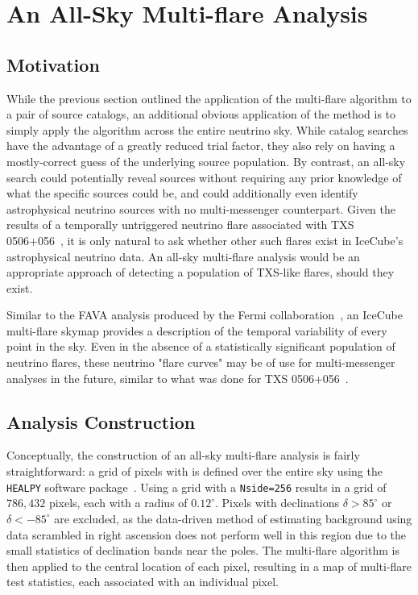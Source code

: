 \chapter{An All-Sky Multi-flare Analysis}\label{chapter:multiflareskymap}
\section{Motivation}
While the previous section outlined the application of the multi-flare algorithm to a pair of source catalogs, an additional obvious application of the method is to simply apply the algorithm across the entire neutrino sky. While catalog searches have the advantage of a greatly reduced trial factor, they also rely on having a mostly-correct guess of the underlying source population. By contrast, an all-sky search could potentially reveal sources without requiring any prior knowledge of what the specific sources could be, and could additionally even identify astrophysical neutrino sources with no multi-messenger counterpart. Given the results of a temporally untriggered neutrino flare associated with TXS 0506+056~\cite{TXS_Archival}, it is only natural to ask whether other such flares exist in IceCube's astrophysical neutrino data. An all-sky multi-flare analysis would be an appropriate approach of detecting a population of TXS-like flares, should they exist. 

Similar to the FAVA analysis produced by the Fermi collaboration~\cite{fava_paper}, an IceCube multi-flare skymap provides a description of the temporal variability of every point in the sky. Even in the absence of a statistically significant population of neutrino flares, these neutrino "flare curves" may be of use for multi-messenger analyses in the future, similar to what was done for TXS 0506+056~\cite{TXS_Archival}\cite{TXS_Multimessenger}.

\section{Analysis Construction}
Conceptually, the construction of an all-sky multi-flare analysis is fairly straightforward: a grid of pixels with  is defined over the entire sky using the \texttt{HEALPY} software package~\cite{healpy2019}. Using a  grid with a \texttt{Nside=256} results in a grid of $786,432$ pixels, each with a radius of $0.12^{\circ}$. Pixels with declinations $\delta>85^{\circ}$ or $\delta<-85^{\circ}$ are excluded, as the data-driven method of estimating background using data scrambled in right ascension does not perform well in this region due to the small statistics of declination bands near the poles. The multi-flare algorithm is then applied to the central location of each pixel, resulting in a map of multi-flare test statistics, each associated with an individual pixel. 

